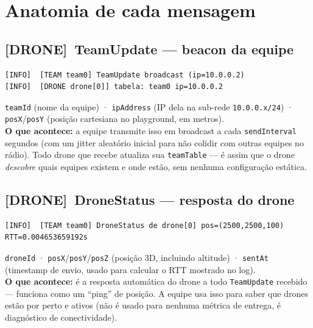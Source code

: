 \documentclass[11pt,a4paper]{article}
\newcommand{\droneTag}{\textcolor{droneblue}{\textbf{[DRONE]}}}
\begin{document}
\section{Anatomia de cada mensagem}

\subsection{\droneTag~TeamUpdate --- beacon da equipe}

\begin{lstlisting}[style=simlog]
[INFO]	[TEAM team0] TeamUpdate broadcast (ip=10.0.0.2)
[INFO]	[DRONE drone[0]] tabela: team0 ip=10.0.0.2
\end{lstlisting}

\begin{explica}
\texttt{teamId} (nome da equipe) · \texttt{ipAddress} (IP dela na sub-rede
\texttt{10.0.0.x/24}) · \texttt{posX}/\texttt{posY} (posição cartesiana no
playground, em metros). \\[2pt]
\textbf{O que acontece:} a equipe transmite isso em broadcast a cada
\texttt{sendInterval} segundos (com um jitter aleatório inicial para não
colidir com outras equipes no rádio). Todo drone que recebe atualiza sua
\texttt{teamTable} --- é assim que o drone \emph{descobre} quais equipes
existem e onde estão, sem nenhuma configuração estática.
\end{explica}

\subsection{\droneTag~DroneStatus --- resposta do drone}

\begin{lstlisting}[style=simlog]
[INFO]	[TEAM team0] DroneStatus de drone[0] pos=(2500,2500,100) RTT=0.004653659192s
\end{lstlisting}

\begin{explica}
\texttt{droneId} · \texttt{posX}/\texttt{posY}/\texttt{posZ} (posição 3D,
incluindo altitude) · \texttt{sentAt} (timestamp de envio, usado para calcular
o RTT mostrado no log). \\[2pt]
\textbf{O que acontece:} é a resposta automática do drone a todo
\texttt{TeamUpdate} recebido --- funciona como um ``ping'' de posição. A
equipe usa isso para saber que drones estão por perto e ativos (não é
usado para nenhuma métrica de entrega, é diagnóstico de conectividade).
\end{explica}
\end{document}
